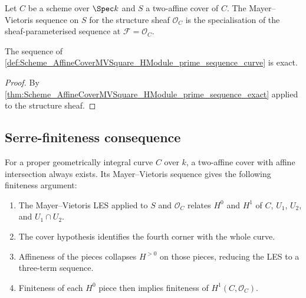 \begin{definition}\leanok
  \label{def:Scheme_AffineCoverMVSquare_HModule_prime_sequence_curve}

  Let \(C\) be a scheme over \(\Spec k\) and \(S\) a two-affine cover of \(C\). The Mayer--Vietoris sequence on \(S\) for the structure sheaf \(\mathcal O_C\) is the specialisation of the sheaf-parameterised sequence at \(\mathcal F = \mathcal O_C\).
\end{definition}

\begin{theorem}\leanok
  \label{thm:Scheme_AffineCoverMVSquare_HModule_prime_sequence_curve_exact}

  The sequence of \cref{def:Scheme_AffineCoverMVSquare_HModule_prime_sequence_curve} is exact.
\end{theorem}

\begin{proof}


\leanok
  By \cref{thm:Scheme_AffineCoverMVSquare_HModule_prime_sequence_exact} applied to the structure sheaf.
\end{proof}

\subsection{Serre-finiteness consequence}

For a proper geometrically integral curve \(C\) over \(k\), a two-affine cover with affine intersection always exists. Its Mayer--Vietoris sequence gives the following finiteness argument:
\begin{enumerate}
  \item The Mayer--Vietoris LES applied to \(S\) and \(\mathcal O_C\) relates \(H^0\) and \(H^1\) of \(C\), \(U_1\), \(U_2\), and \(U_1 \cap U_2\).
  \item The cover hypothesis identifies the fourth corner with the whole curve.
  \item Affineness of the pieces collapses \(H^{>0}\) on those pieces, reducing the LES to a three-term sequence.
  \item Finiteness of each \(H^0\) piece then implies finiteness of \(H^1(C, \mathcal O_C)\).
\end{enumerate}
